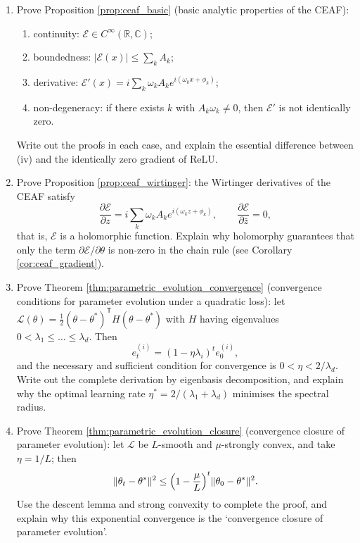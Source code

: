 \begin{enumerate}[leftmargin=3em, label=\textbf{Exercise \arabic*}]
    \item Prove Proposition \ref{prop:ceaf_basic} (basic analytic properties of the CEAF):
    \begin{enumerate}[label=(\roman*)]
        \item continuity: $\mathcal{E}\in C^\infty(\mathbb{R},\mathbb{C})$;
        \item boundedness: $|\mathcal{E}(x)|\le\sum_kA_k$;
        \item derivative: $\mathcal{E}'(x)=i\sum_k\omega_kA_ke^{i(\omega_kx+\phi_k)}$;
        \item non-degeneracy: if there exists $k$ with $A_k\omega_k\neq0$, then $\mathcal{E}'$ is not identically zero.
    \end{enumerate}
    Write out the proofs in each case, and explain the essential difference between (iv) and the identically zero gradient of ReLU.

    \item Prove Proposition \ref{prop:ceaf_wirtinger}:
    the Wirtinger derivatives of the CEAF satisfy
    \[
    \frac{\partial\mathcal{E}}{\partial z}
    =i\sum_k\omega_kA_ke^{i(\omega_kz+\phi_k)},\qquad
    \frac{\partial\mathcal{E}}{\partial\bar{z}}=0,
    \]
    that is, $\mathcal{E}$ is a holomorphic function.
    Explain why holomorphy guarantees that only the term $\partial\mathcal{E}/\partial\theta$ is non-zero in the chain rule
    (see Corollary \ref{cor:ceaf_gradient}).

    \item Prove Theorem \ref{thm:parametric_evolution_convergence} (convergence conditions for parameter evolution under a quadratic loss):
    let $\mathcal{L}(\theta)=\frac12(\theta-\theta^*)^{\mathsf T}H(\theta-\theta^*)$
    with $H$ having eigenvalues $0<\lambda_1\le\dots\le\lambda_d$. Then
    \[
    e_t^{(i)}=(1-\eta\lambda_i)^te_0^{(i)},
    \]
    and the necessary and sufficient condition for convergence is $0<\eta<2/\lambda_d$.
    Write out the complete derivation by eigenbasis decomposition,
    and explain why the optimal learning rate $\eta^*=2/(\lambda_1+\lambda_d)$ minimises the spectral radius.

    \item Prove Theorem \ref{thm:parametric_evolution_closure} (convergence closure of parameter evolution):
    let $\mathcal{L}$ be $L$-smooth and $\mu$-strongly convex, and take $\eta=1/L$; then
    \[
    \|\theta_t-\theta^*\|^2
    \le\Bigl(1-\frac{\mu}{L}\Bigr)^t\|\theta_0-\theta^*\|^2.
    \]
    Use the descent lemma and strong convexity to complete the proof,
    and explain why this exponential convergence is the `convergence closure of parameter evolution'.


\end{enumerate}
